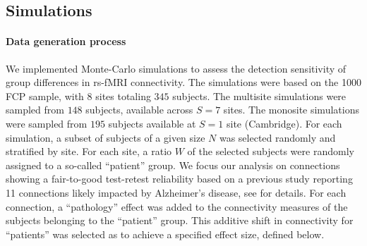 \documentclass[authoryear]{elsarticle}
\begin{document}
\subsection{Simulations}

\paragraph{Data generation process}
We implemented Monte-Carlo simulations to assess the detection sensitivity of group differences in rs-fMRI connectivity. The simulations were based on the 1000 FCP sample, with 8 sites totaling $345$ subjects. The multisite simulations were sampled from $148$ subjects, available across $S=7$ sites. The monosite simulations were sampled from $195$ subjects available at $S=1$ site (Cambridge). For each simulation, a subset of subjects of a given size $N$ was selected randomly and stratified by site. For each site, a ratio $W$ of the selected subjects were randomly assigned to a so-called  ``patient'' group. 
We focus our analysis on connections showing a fair-to-good test-retest reliability based on a previous study reporting 11 connections likely impacted by Alzheimer's disease, see \cite{Orban2015} for details. For each connection, a ``pathology'' effect was added to the connectivity measures of the subjects belonging to the ``patient'' group. This additive shift in connectivity for ``patients'' was selected as to achieve a specified effect size, defined below. 

% 
% 

\end{document}
